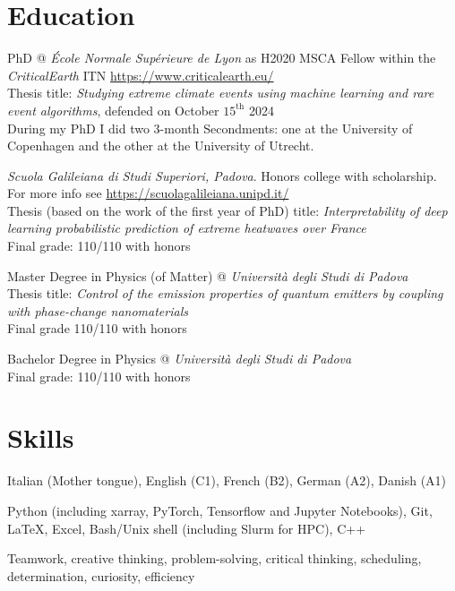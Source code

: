 \documentclass[11pt, a4 paper]{article}
\begin{document}
\section*{Education}
  \begin{description}[style=multiline,leftmargin=3cm,align=right]
    \item[2021-2024]
      PhD @ \emph{\'Ecole Normale Supérieure de Lyon} as H2020 MSCA Fellow within the \emph{CriticalEarth} ITN \url{https://www.criticalearth.eu/} \\
      Thesis title: \emph{Studying extreme climate events using machine learning and rare event algorithms}, defended on October $15^\mathrm{th}$ 2024 \\
      During my PhD I did two 3-month Secondments: one at the University of Copenhagen and the other at the University of Utrecht.
    \item[2016-2022]
      \emph{Scuola Galileiana di Studi Superiori, Padova}. Honors college with scholarship. For more info see \url{https://scuolagalileiana.unipd.it/} \\
      Thesis (based on the work of the first year of PhD) title: \emph{Interpretability of deep learning probabilistic prediction of extreme heatwaves over France} \\
      Final grade: 110/110 with honors
    \item[2019-2021]
      Master Degree in Physics (of Matter) @ \emph{Università degli Studi di Padova} \\
      Thesis title: \emph{Control of the emission properties of quantum emitters by coupling with phase-change nanomaterials} \\
      Final grade 110/110 with honors
    \item[2016-2019]
      Bachelor Degree in Physics @ \emph{Università degli Studi di Padova} \\
      Final grade: 110/110 with honors
  \end{description}




\section*{Skills}
  \begin{description}[style=multiline,leftmargin=3cm,align=right]
    \item[Languages]
      Italian (Mother tongue), English (C1), French (B2), German (A2), Danish (A1)
    \item[Software]
      Python (including xarray, PyTorch, Tensorflow and Jupyter Notebooks), Git, LaTeX, Excel, Bash/Unix shell (including Slurm for HPC), C++
    \item[Transversal]
      Teamwork, creative thinking, problem-solving, critical thinking, scheduling, determination, curiosity, efficiency
  \end{description}
\end{document}
